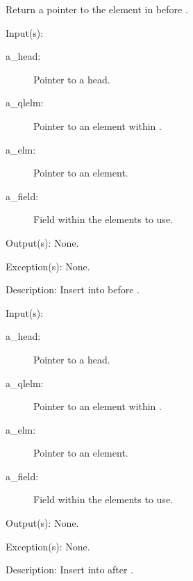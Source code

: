 \begin{capi}
\begin{capilist}
		Return a pointer to the element in  before
		.
	\end{capilist}
\label{ql_before_insert}
	\begin{capilist}
	\item[Input(s): ]
		\begin{description}\item[]
		\item[a\_head: ]
			Pointer to a  head.
		\item[a\_qlelm: ]
			Pointer to an element within .
		\item[a\_elm: ]
			Pointer to an element.
		\item[a\_field: ]
			Field within the  elements to use.
		\end{description}
	\item[Output(s): ] None.
	\item[Exception(s): ] None.
	\item[Description: ]
		Insert  into  before .
	\end{capilist}
\label{ql_after_insert}
	\begin{capilist}
	\item[Input(s): ]
		\begin{description}\item[]
		\item[a\_head: ]
			Pointer to a \classname{ql} head.
		\item[a\_qlelm: ]
			Pointer to an element within \cvar{a\_head}.
		\item[a\_elm: ]
			Pointer to an element.
		\item[a\_field: ]
			Field within the  elements to use.
		\end{description}
	\item[Output(s): ] None.
	\item[Exception(s): ] None.
	\item[Description: ]
		Insert  into  after \cvar{a\_qlelm}.
	\end{capilist}
\label{ql_head_insert}

\end{capi}
